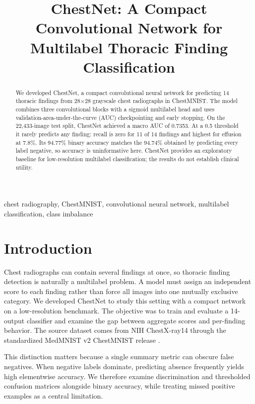 \documentclass[conference]{IEEEtran}
\begin{document}
\title{ChestNet: A Compact Convolutional Network for Multilabel Thoracic Finding Classification}
\author{}
\maketitle
\begin{abstract}
We developed ChestNet, a compact convolutional neural network for predicting 14 thoracic findings from 28$\times$28 grayscale chest radiographs in ChestMNIST. The model combines three convolutional blocks with a sigmoid multilabel head and uses validation-area-under-the-curve (AUC) checkpointing and early stopping. On the 22,433-image test split, ChestNet achieved a macro AUC of 0.7353. At a 0.5 threshold it rarely predicts any finding: recall is zero for 11 of 14 findings and highest for effusion at 7.8\%. Its 94.77\% binary accuracy matches the 94.74\% obtained by predicting every label negative, so accuracy is uninformative here. ChestNet provides an exploratory baseline for low-resolution multilabel classification; the results do not establish clinical utility.
\end{abstract}
\begin{IEEEkeywords}
chest radiography, ChestMNIST, convolutional neural network, multilabel classification, class imbalance
\end{IEEEkeywords}

\section{Introduction}
Chest radiographs can contain several findings at once, so thoracic finding detection is naturally a multilabel problem. A model must assign an independent score to each finding rather than force all images into one mutually exclusive category. We developed ChestNet to study this setting with a compact network on a low-resolution benchmark. The objective was to train and evaluate a 14-output classifier and examine the gap between aggregate scores and per-finding behavior. The source dataset comes from NIH ChestX-ray14 through the standardized MedMNIST v2 ChestMNIST release \cite{medmnist,wang}.

This distinction matters because a single summary metric can obscure false negatives. When negative labels dominate, predicting absence frequently yields high elementwise accuracy. We therefore examine discrimination and thresholded confusion matrices alongside binary accuracy, while treating missed positive examples as a central limitation.
\end{document}
